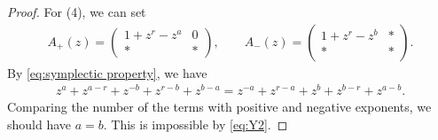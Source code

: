 \documentclass[10pt,a4paper]{amsart}
\begin{document}
\begin{proof}
 For (4), we can set
 \begin{align*}
 A_+(z) =
 \begin{pmatrix}
 1 + z^r -z^a & 0 \\
 * & *
 \end{pmatrix},\qquad
 A_-(z) =
 \begin{pmatrix}
 1 + z^r - z^b & * \\
 * & *
 \end{pmatrix}.
 \end{align*}
 By \eqref{eq:symplectic property}, we have
 \begin{align*}
 z^{a} + z^{a-r} + z^{-b} + z^{r-b} + z^{b-a} =
 z^{-a} + z^{r-a} + z^{b} + z^{b-r} + z^{a-b}.
 \end{align*}
 Comparing the number of the terms with positive and negative exponents,
 we should have $a = b$. This is impossible by \eqref{eq:Y2}.
\end{proof}
\end{document}
